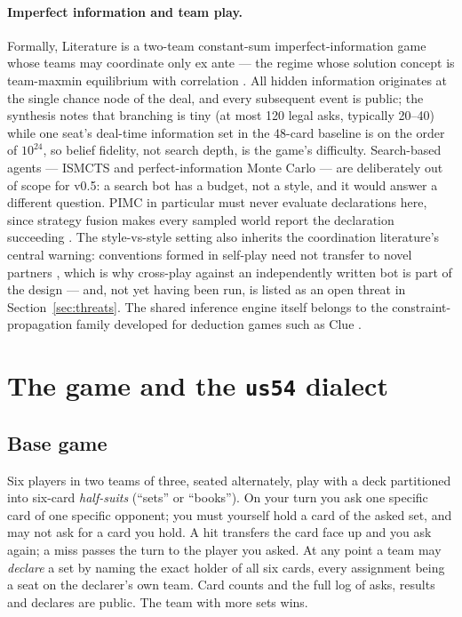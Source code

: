 \documentclass[11pt]{article}
\newcommand{\code}[1]{\texttt{#1}}
\newcommand{\usff}{\code{us54}}
\begin{document}
\paragraph{Imperfect information and team play.}
Formally, Literature is a two-team constant-sum imperfect-information game whose teams may
coordinate only ex ante --- the regime whose solution concept is team-maxmin equilibrium with
correlation \cite{celli2018}. All hidden information originates at the single chance node of
the deal, and every subsequent event is public; the synthesis \cite{playstyles} notes that
branching is tiny (at most 120 legal asks, typically 20--40) while one seat's deal-time
information set in the 48-card baseline is on the order of $10^{24}$, so belief fidelity, not
search depth, is the game's difficulty. Search-based agents --- ISMCTS \cite{cowling2012} and
perfect-information Monte Carlo \cite{long2010} --- are deliberately out of scope for v0.5: a
search bot has a budget, not a style, and it would answer a different question. PIMC in
particular must never evaluate declarations here, since strategy fusion makes every sampled
world report the declaration succeeding \cite{long2010,containment}. The style-vs-style
setting also inherits the coordination literature's central warning: conventions formed in
self-play need not transfer to novel partners \cite{hu2020,bard2020}, which is why cross-play
against an independently written bot is part of the design --- and, not yet having been run,
is listed as an open threat in Section~\ref{sec:threats}. The shared inference engine itself
belongs to the constraint-propagation family developed for deduction games such as Clue
\cite{neller2018}.

\section{The game and the \usff{} dialect}
\label{sec:game}

\subsection{Base game}

Six players in two teams of three, seated alternately, play with a deck partitioned into
six-card \emph{half-suits} (``sets'' or ``books''). On your turn you ask one specific card of
one specific opponent; you must yourself hold a card of the asked set, and may not ask for a
card you hold. A hit transfers the card face up and you ask again; a miss passes the turn to
the player you asked. At any point a team may \emph{declare} a set by naming the exact holder
of all six cards, every assignment being a seat on the declarer's own team. Card counts and
the full log of asks, results and declares are public. The team with more sets wins.
\end{document}
